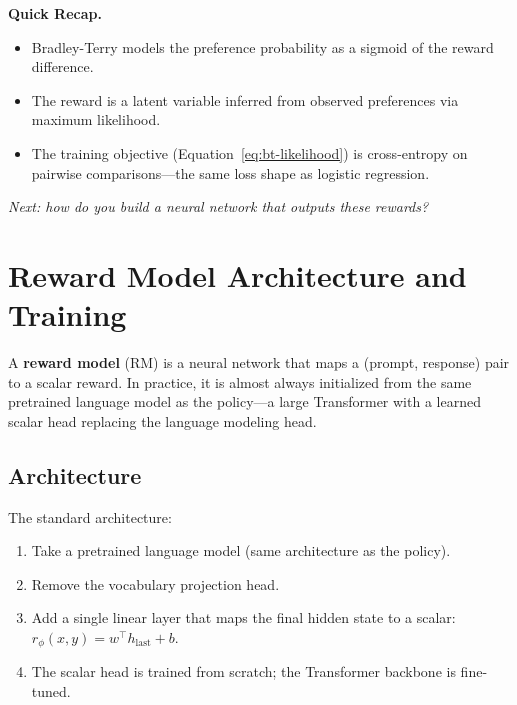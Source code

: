 \noindent{}

\begin{quickrecap}
\textbf{Quick Recap.}
\begin{itemize}[nosep,leftmargin=1.5em]
  \item Bradley-Terry models the preference probability as a sigmoid of the reward difference.
  \item The reward is a latent variable inferred from observed preferences via maximum likelihood.
  \item The training objective (Equation~\ref{eq:bt-likelihood}) is cross-entropy on pairwise comparisons---the same loss shape as logistic regression.
\end{itemize}
\textit{Next: how do you build a neural network that outputs these rewards?}
\end{quickrecap}


\section{Reward Model Architecture and Training}
\label{sec:reward-model}

A \textbf{reward model} (RM) is a neural network that maps a (prompt, response) pair to a scalar reward. In practice, it is almost always initialized from the same pretrained language model as the policy---a large Transformer with a learned scalar head replacing the language modeling head.

\subsection{Architecture}

The standard architecture:

\begin{enumerate}[nosep]
  \item Take a pretrained language model (same architecture as the policy).
  \item Remove the vocabulary projection head.
  \item Add a single linear layer that maps the final hidden state to a scalar: $r_\phi(x, y) = w^\top h_{\text{last}} + b$.
  \item The scalar head is trained from scratch; the Transformer backbone is fine-tuned.
\end{enumerate}

